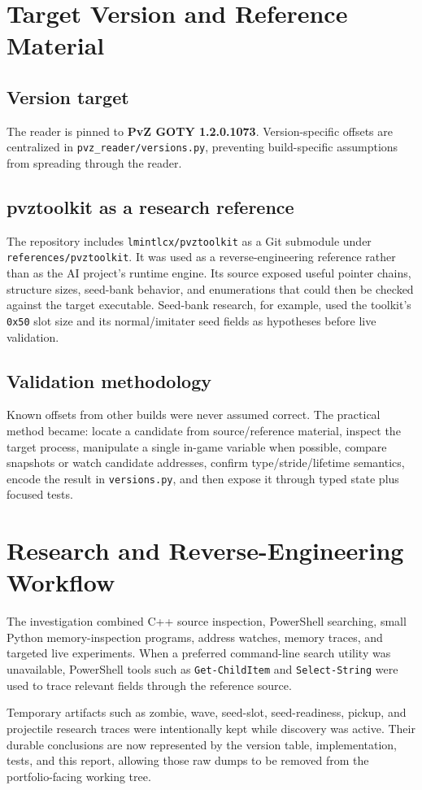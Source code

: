 \documentclass[11pt,a4paper]{article}
\begin{document}
\section{Target Version and Reference Material}
\subsection{Version target}
The reader is pinned to \textbf{PvZ GOTY 1.2.0.1073}. Version-specific offsets are centralized in \texttt{pvz\_reader/versions.py}, preventing build-specific assumptions from spreading through the reader.
\subsection{pvztoolkit as a research reference}
The repository includes \texttt{lmintlcx/pvztoolkit} as a Git submodule under \texttt{references/pvztoolkit}. It was used as a reverse-engineering reference rather than as the AI project's runtime engine. Its source exposed useful pointer chains, structure sizes, seed-bank behavior, and enumerations that could then be checked against the target executable. Seed-bank research, for example, used the toolkit's \texttt{0x50} slot size and its normal/imitater seed fields as hypotheses before live validation.
\subsection{Validation methodology}
Known offsets from other builds were never assumed correct. The practical method became: locate a candidate from source/reference material, inspect the target process, manipulate a single in-game variable when possible, compare snapshots or watch candidate addresses, confirm type/stride/lifetime semantics, encode the result in \texttt{versions.py}, and then expose it through typed state plus focused tests.
\section{Research and Reverse-Engineering Workflow}
The investigation combined C++ source inspection, PowerShell searching, small Python memory-inspection programs, address watches, memory traces, and targeted live experiments. When a preferred command-line search utility was unavailable, PowerShell tools such as \texttt{Get-ChildItem} and \texttt{Select-String} were used to trace relevant fields through the reference source.

Temporary artifacts such as zombie, wave, seed-slot, seed-readiness, pickup, and projectile research traces were intentionally kept while discovery was active. Their durable conclusions are now represented by the version table, implementation, tests, and this report, allowing those raw dumps to be removed from the portfolio-facing working tree.
\end{document}
